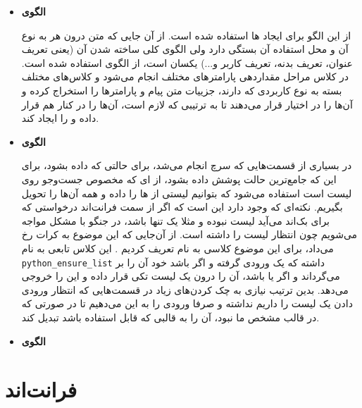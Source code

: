 \begin{itemize}
	\item
	\textbf{الگوی }
	
	از این الگو برای ایجاد  ها استفاده شده است. از آن جایی که متن درون هر  به نوع آن  و محل استفاده آن بستگی دارد ولی الگوی کلی ساخته شدن آن (یعنی تعریف عنوان، تعریف بدنه، تعریف کاربر و...) یکسان است، از الگوی  استفاده شده است. در کلاس  مراحل مقداردهی پارامترهای مختلف  انجام می‌شود و کلاس‌های مختلف  بسته به نوع کاربردی که دارند، جزییات متن پیام و پارامترها را استخراج کرده و آن‌‌ها را در اختیار  قرار می‌دهند تا به ترتیبی که لازم است، آن‌ها را در کنار هم قرار داده و  را ایجاد کند.
	
	
	\item
	\textbf{الگوی }
	
	در بسیاری از قسمت‌هایی که سرچ انجام می‌شد، برای حالتی که  داده بشود، برای این که جامع‌ترین حالت پوشش داده بشود، از  ای که مخصوص جست‌وجو روی لیست است استفاده می‌شود که بتوانیم لیستی از  ها را داده و همه آن‌ها را تحویل بگیریم. نکته‌ای که وجود دارد این است که اگر از سمت فرانت‌اند درخواستی که برای بک‌اند می‌آید لیست نبوده و مثلا یک  تنها باشد، در  جنگو با مشکل مواجه می‌شویم چون انتظار لیست را داشته است. از آن‌جایی که این موضوع به کرات رخ می‌داد، برای این موضوع کلاسی به نام  تعریف کردیم . این کلاس تابعی به نام \verb+python_ensure_list+  داشته که یک ورودی گرفته و اگر  باشد خود آن را بر می‌گرداند و اگر  یا  باشد، آن‌ را درون یک لیست تکی قرار داده و این  را خروجی می‌دهد. بدین ترتیب نیازی به چک کردن‌های زیاد در قسمت‌هایی که انتظار ورودی دادن یک لیست را داریم نداشته و صرفا ورودی را به این  می‌دهیم تا در صورتی که در قالب مشخص ما نبود، آن را به قالبی که قابل استفاده باشد تبدیل کند.
	
	
		\item 
	\textbf{الگوی }
	
	
\end{itemize}

\newpage

\section{فرانت‌اند}
\label{designpattern:front}


